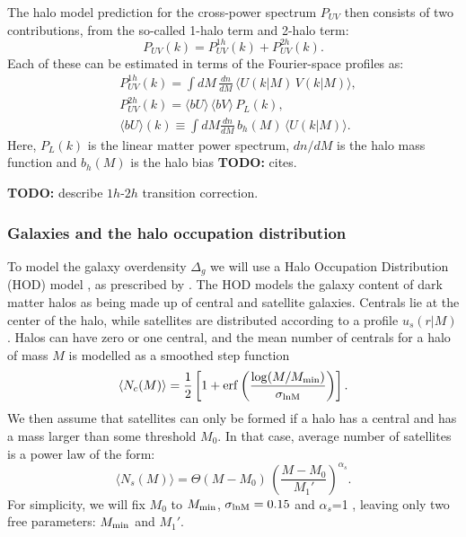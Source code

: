 \documentclass[useAMS,usenatbib]{mn2e}
\newcommand{\TODO}[1]{{\bf TODO:} #1}
\begin{document}
    The halo model prediction for the cross-power spectrum $P_{UV}$ then consists of two contributions, from the so-called 1-halo term and 2-halo term:
    \begin{equation}
      P_{UV}(k)=P^{1h}_{UV}(k)+P^{2h}_{UV}(k).
    \end{equation}
    Each of these can be estimated in terms of the Fourier-space profiles as:
    \begin{align}
      &P^{1h}_{UV}(k)=\int dM\,\frac{dn}{dM}\,\langle U(k|M)\,V(k|M)\rangle,\\
      &P^{2h}_{UV}(k)=\langle bU\rangle\,\langle bV\rangle\,P_L(k),\\
      &\langle bU\rangle(k)\equiv\int dM\frac{dn}{dM}\,b_h(M)\,\langle U(k|M)\rangle. \label{eq:hm_bias}
    \end{align}
    Here, $P_L(k)$ is the linear matter power spectrum, $dn/dM$ is the halo mass function and $b_h(M)$ is the halo bias \TODO{cites}. %
    
    \TODO{describe $1h$-$2h$ transition correction.}
    
    \subsubsection{Galaxies and the halo occupation distribution}\label{sssec:theory.hm.hod}
      To model the galaxy overdensity $\Delta_g$ we will use a Halo Occupation Distribution (HOD) model \cite{2002ApJ...575..587B,2005ApJ...633..791Z,2013MNRAS.430..725V}, as prescribed by \cite{2011ApJ...736...59Z}. The HOD models the galaxy content of dark matter halos as being made up of central and satellite galaxies. Centrals lie at the center of the halo, while satellites are distributed according to a profile $u_s(r|M)$. Halos can have zero or one central, and the mean number of centrals for a halo of mass $M$ is modelled as a smoothed step function
      \begin{equation}
        \langle N_c(M)\rangle=\frac{1}{2}\left[1+{\rm erf}\left(\frac{\log(M/M_{\rm min})}{\sigma_{\rm lnM}}\right)\right].
      \end{equation}
      We then assume that satellites can only be formed if a halo has a central and has a mass larger than some threshold $M_0$. In that case, average number of satellites is a power law of the form:
      \begin{equation}
        \langle N_s(M)\rangle=\Theta(M-M_0)\,\left(\frac{M-M_0}{M_1'}\right)^{\alpha_s}.
      \end{equation}
      For simplicity, we will fix $M_0$ to $M_{\rm min}$, $\sigma_{\rm lnM}=0.15$ and $\alpha_s$=1 \cite{2018MNRAS.473.4318A}, leaving only two free parameters: $M_{\rm min}$ and $M_1'$.
      
\end{document}
